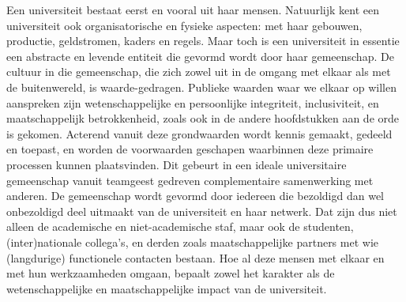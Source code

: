 \documentclass[smallauthor, chapterhaspagenum, nochapterinheader, pagenuminheader,  bigchapnum,medium2, tocpages,  garamond, titleinheader]{jote-book}
\begin{document}
	Een universiteit bestaat eerst en vooral uit haar mensen. Natuurlijk kent een universiteit ook organisatorische en fysieke aspecten: met haar gebouwen, productie, geldstromen, kaders en regels. Maar toch is een universiteit in essentie een abstracte en levende entiteit die gevormd wordt door haar gemeenschap. De cultuur in die gemeenschap, die zich zowel uit in de omgang met elkaar als met de buitenwereld, is waarde-gedragen. Publieke waarden waar we elkaar op willen aanspreken zijn wetenschappelijke en persoonlijke integriteit, inclusiviteit, en maatschappelijk betrokkenheid, zoals ook in de andere hoofdstukken aan de orde is gekomen. Acterend vanuit deze grondwaarden wordt kennis gemaakt, gedeeld en toepast, en worden de voorwaarden geschapen waarbinnen deze primaire processen kunnen plaatsvinden. Dit gebeurt in een ideale universitaire gemeenschap vanuit teamgeest gedreven complementaire samenwerking met anderen. De gemeenschap wordt gevormd door iedereen die bezoldigd dan wel onbezoldigd deel uitmaakt van de universiteit en haar netwerk. Dat zijn dus niet alleen de academische en niet-academische staf, maar ook de studenten, (inter)nationale collega's, en derden zoals maatschappelijke partners met wie (langdurige) functionele contacten bestaan. Hoe al deze mensen met elkaar en met hun werkzaamheden omgaan, bepaalt zowel het karakter als de wetenschappelijke en maatschappelijke impact van de universiteit.
\end{document}
